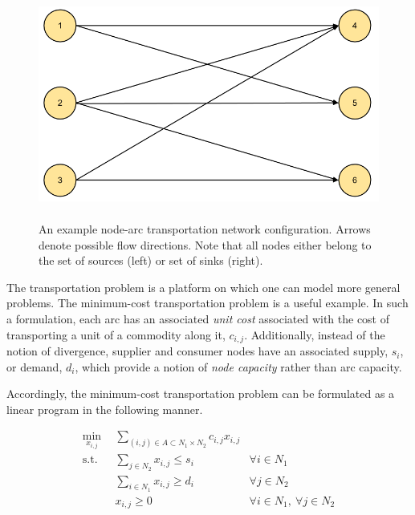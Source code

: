 \begin{figure}[H]
  \begin{center}
    \includegraphics[height=7.5cm]{./chapters/1-intro/figs/node-arcs-bipartite.png}
  \caption{An example node-arc transportation network configuration. Arrows
    denote possible flow directions. Note that all nodes either belong to the 
    set of sources (left) or set of sinks (right).}
  \label{fig:node-arcs-bipartite}
  \end{center}
\end{figure}

The transportation problem is a platform on which one can model more general
problems. The minimum-cost transportation problem is a useful example. In such a
formulation, each arc has an associated \textit{unit cost} associated with the
cost of transporting a unit of a commodity along it, $c_{i,j}$. Additionally,
instead of the notion of divergence, supplier and consumer nodes have an
associated supply, $s_i$, or demand, $d_i$, which provide a notion
of \textit{node capacity} rather than arc capacity.

Accordingly, the minimum-cost transportation problem can be formulated as a
linear program in the following manner.

\begin{subequations}\label{eqs:xport}
  \begin{align}
    \min_{x_{i,j}} \:\: & 
    \sum_{(i, j) \in A \subset N_1 \times N_2} c_{i,j} x_{i,j}
    & \label{eqs:xport_obj} \\
    \text{s.t.} \:\: &
    \sum_{j \in N_2} x_{i,j} \leq s_i
    & \forall i \in N_1  \\
    &
    \sum_{i \in N_1} x_{i,j} \geq d_i
    & \forall j \in N_2  \\
    &
    x_{i,j} \geq 0
    & \forall i \in N_1, \: \forall j \in N_2 \label{eqs:xport_x}
  \end{align}
\end{subequations}

